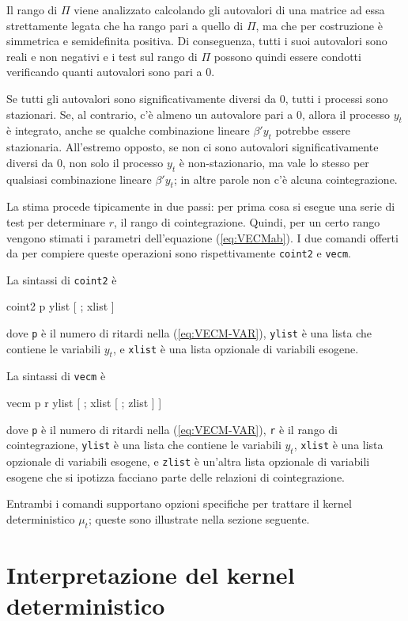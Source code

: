 Il rango di $\Pi$ viene analizzato calcolando gli autovalori di una matrice ad
essa strettamente legata che ha rango pari a quello di $\Pi$, ma che per
costruzione è simmetrica e semidefinita positiva. Di conseguenza, tutti i suoi
autovalori sono reali e non negativi e i test sul rango di $\Pi$ possono quindi
essere condotti verificando quanti autovalori sono pari a 0.

Se tutti gli autovalori sono significativamente diversi da 0, tutti i processi
sono stazionari. Se, al contrario, c'è almeno un autovalore pari a 0, allora
il processo $y_t$ è integrato, anche se qualche combinazione lineare $\beta'y_t$
potrebbe essere stazionaria. All'estremo opposto, se non ci sono autovalori
significativamente diversi da 0, non solo il processo $y_t$ è non-stazionario,
ma vale lo stesso per qualsiasi combinazione lineare $\beta'y_t$; in altre
parole non c'è alcuna cointegrazione.

La stima procede tipicamente in due passi: per prima cosa si esegue una serie di
test per determinare $r$, il rango di cointegrazione. Quindi, per un certo rango
vengono stimati i parametri dell'equazione (\ref{eq:VECMab}). I due comandi
offerti da  per compiere queste operazioni sono rispettivamente
\texttt{coint2} e \texttt{vecm}.

La sintassi di \texttt{coint2} è
\begin{code}
  coint2 p ylist [ ; xlist ]
\end{code}
dove \texttt{p} è il numero di ritardi nella (\ref{eq:VECM-VAR}),
\texttt{ylist} è una lista che contiene le variabili $y_t$, e
\texttt{xlist} è una lista opzionale di variabili esogene.

La sintassi di \texttt{vecm} è
\begin{code}
  vecm p r ylist [ ; xlist [ ; zlist ] ]
\end{code}
dove \texttt{p} è il numero di ritardi nella (\ref{eq:VECM-VAR}),
\texttt{r} è il rango di cointegrazione, \texttt{ylist} è una lista
che contiene le variabili $y_t$, \texttt{xlist} è una lista opzionale di
variabili esogene, e \texttt{zlist} è un'altra lista opzionale di variabili
esogene che si ipotizza facciano parte delle relazioni di cointegrazione.

Entrambi i comandi supportano opzioni specifiche per trattare il kernel
deterministico $\mu_t$; queste sono illustrate nella sezione seguente.

\section{Interpretazione del kernel deterministico}
\label{sec:coint-5cases}

